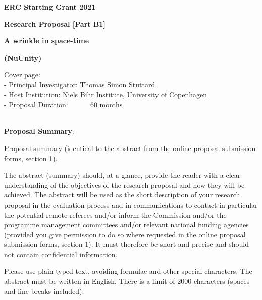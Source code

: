 \documentclass[a4paper,11pt]{article}
\renewcommand{\smallskip} {\vspace{0.1in}}
\begin{document}
\renewcommand{\headrulewidth}{0pt}

\pagestyle{fancyplain}


\vspace{1cm}

\centerline{ \large \textbf{ERC Starting Grant 2021}} \smallskip
\centerline{ \large \textbf {Research Proposal [Part B1]}} \smallskip

\vspace{1.0cm}

%
\centerline{\huge \textbf{A wrinkle in space-time}}
\vspace{0.5cm}
\centerline{ \huge {\bf (NuUnity)}} 



\vspace{1.5cm}

\noindent
Cover page: \\
- Principal Investigator: Thomas Simon Stuttard\\
- Host Institution: Niels Bihr Institute, University of Copenhagen\\
- Proposal Duration: ~~~~~    $60$ months\\

~\vspace{0. cm}

\noindent
{\bf Proposal Summary}:

Proposal summary (identical to the abstract from the online proposal submission forms, section 1). 

The abstract (summary) should, at a glance, provide the reader with a clear understanding of the objectives of the research proposal and how they will be achieved. The abstract will be used as the short description of your research proposal in the evaluation process and in communications to contact in particular the potential remote referees and/or inform the Commission and/or the programme management committees and/or relevant national funding agencies (provided you give permission to do so where requested in the online proposal submission forms, section 1). It must therefore be short and precise and should not contain confidential information. 

Please use plain typed text, avoiding formulae and other special characters. The abstract must be written in English. There is a limit of 2000 characters (spaces and line breaks included).
\end{document}
